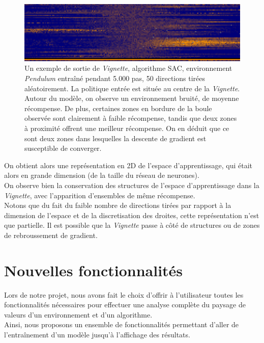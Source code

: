 \documentclass[12pt]{article}
\begin{document}
\begin{figure}[htp]
    \centering
    \includegraphics[width=12cm]{Images/Vignette_pendulum}
    \caption{Un exemple de sortie de \emph{Vignette}, algorithme SAC, environnement \emph{Pendulum} entraîné pendant 5.000 pas, 50 directions tirées aléatoirement. La politique entrée est située au centre de la \emph{Vignette}. Autour du modèle, on observe un environnement bruité, de moyenne récompense. De plus, certaines zones en bordure de la boule observée sont clairement à faible récompense, tandis que deux zones à proximité offrent une meilleur récompense. On en déduit que ce sont deux zones dans lesquelles la descente de gradient est susceptible de converger.}
    \label{fig:vignettePendulum}
\end{figure}

On obtient alors une représentation en 2D de l’espace d’apprentissage, qui était alors en grande dimension (de la taille du réseau de neurones). \\

On observe bien la conservation des structures de l'espace d'apprentissage dans la \emph{Vignette}, avec l'apparition d'ensembles de même récompense. \\

Notons que du fait du faible nombre de directions tirées par rapport à la dimension de l'espace et de la discretisation des droites, cette représentation n’est que partielle. Il est possible que la \emph{Vignette} passe à côté de structures ou de zones de rebroussement de gradient. \\

\section{Nouvelles fonctionnalités}

Lors de notre projet, nous avons fait le choix d'offrir à l'utilisateur toutes les fonctionnalités nécessaires pour effectuer une analyse complète du paysage de valeurs d'un environnement et d'un algorithme. \\

Ainsi, nous proposons un ensemble de fonctionnalités permettant d'aller de l'entraînement d'un modèle jusqu'à l'affichage des résultats. \\
\end{document}
